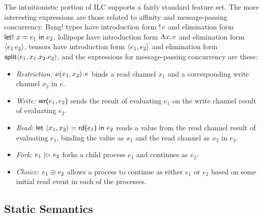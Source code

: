 The intuitionistic portion of ILC supports a fairly standard feature set. The
more interesting expressions are those related to affinity and message-passing
concurrency. Bang! types have introduction form ${!}\,{e}$ and elimination form
$\text{\textsf{let!}}\ {x} = {e_1}\ \text{\textsf{in}}\ {e_2}$, lollipops have introduction form $\Lambda{x}.\,{e}$ and
elimination form $\langle{e_1}\,{e_2}\rangle$, tensors have introduction form
$\langle{e_1},{e_2}\rangle$ and elimination form $\text{\textsf{split}}\langle{e_1},{x_1}.{x_2}.{e_2}\rangle$, and
the expressions for message-passing concurrency are these:
\begin{itemize}[leftmargin=*]
  \item \emph{Restriction:} $\nu(x_1, x_2).\,e$ binds a read channel $x_1$ and
    a corresponding write channel $x_2$ in $e$.
  \item \emph{Write:} $\text{\textsf{wr}}\textsf{(}{e_1},{e_2}\textsf{)}$ sends the result of evaluating $e_1$ on
    the write channel result of evaluating $e_2$.
  \item \emph{Read:} $\text{\textsf{let}}\ {\langle{x_1},{x_2}\rangle} = {\text{\textsf{rd}}\textsf{(}{e_1}\textsf{)}}\ \text{\textsf{in}}\ {{e_2}}$ reads a value from the read
    channel result of evaluating $e_1$, binding the value as $x_1$ and the read
    channel as $x_2$ in $e_2$.
  \item \emph{Fork:} $e_1 \mathrel{|\rhd} e_2$ forks a child process $e_1$ and
    continues as $e_2$.
  \item \emph{Choice:} $e_1 \mathrel{\oplus} e_2$ allows a process to continue as
    either $e_1$ or $e_2$ based on some initial read event in each of the
    processes.
\end{itemize}

%  

\subsection{Static Semantics}
\label{subsec:types}

